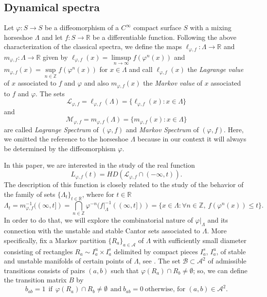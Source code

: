\documentclass[12pt]{amsart}
\newcommand{\infinity}{\infty}
\theoremstyle{plain} %
\theoremstyle{definition} %
\numberwithin{equation}{section}
\begin{document}
\subsection{Dynamical spectra}

Let $\varphi:S\rightarrow S$ be a diffeomorphism of a $C^{\infty}$ compact surface $S$ with a mixing horseshoe $\Lambda$ and let $f:S\rightarrow \mathbb{R}$ be a differentiable function. Following the above characterization of the classical spectra, we define the maps $\ell_{\varphi,f}: \Lambda \rightarrow \mathbb{R}$ and $m_{\varphi,f}: \Lambda \rightarrow \mathbb{R}$ given by $\ell_{\varphi,f}(x)=\limsup\limits_{n\to \infty}f(\varphi^n(x))$ and $m_{\varphi,f}(x)=\sup\limits_{n\in\mathbb{Z}}f(\varphi^n(x))$ for $x\in \Lambda$ and call $\ell_{\varphi,f}(x)$ the \textit{Lagrange value} of $x$ associated to $f$ and $\varphi$ and also $m_{\varphi,f}(x)$ the \textit{Markov value} of $x$ associated to $f$ and $\varphi$. The sets
$$\mathcal{L}_{\varphi,f}=\ell_{\varphi,f}(\Lambda)=\{\ell_{\varphi,f}(x):x\in \Lambda\}$$
and
$$\mathcal{M}_{\varphi,f}=m_{\varphi,f}(\Lambda)=\{m_{\varphi,f}(x):x\in \Lambda\}$$
are called \textit{Lagrange Spectrum} of $(\varphi,f)$ and \textit{Markov Spectrum} of $(\varphi,f)$. Here, we omitted the reference to the horseshoe $\Lambda$ because in our context it will always be determined by the diffeomorphism $\varphi.$

In this paper, we are interested in the study of the real function 
\begin{equation}\label{f1}
L_{\varphi,f}(t)=HD(\mathcal{L}_{\varphi,f}\cap (-\infty,t)) .
\end{equation}
The description of this function is closely related to the study of the behavior of the family of sets $\{\Lambda_t\}_{t\in \mathbb{R}}$, where for $t\in \mathbb{R}$
$$\Lambda_t=m_{\varphi, f}^{-1}((\infinity,t]) =\bigcap\limits_{n\in\mathbb{Z}}\varphi^{-n}(f|_{\Lambda}^{-1}((\infinity,t])) = \{x\in\Lambda: \forall n\in \mathbb{Z}, \ f(\varphi^n(x))\leq t\}.$$
In order to do that, we will explore the combinatorial nature of $\varphi|_{\Lambda}$ and its connection with the unstable and stable Cantor sets associated to $\Lambda$. More specifically, fix a Markov partition $\{R_a\}_{a\in \mathcal{A}}$ of $\Lambda$ with sufficiently small diameter consisting of rectangles $R_a \sim I_a^u \times I_a^s$ delimited by compact pieces $I_a^s$, $I_a^u$, of stable and unstable manifolds of certain points of $\Lambda$, see \cite[Theorem 2, page 172]{PT93}. The set $\mathcal{B}\subset \mathcal{A}^{2}$ of admissible transitions consists of pairs $(a,b)$ such that $\varphi(R_a)\cap R_{b}\neq \emptyset$; so, we can define the transition matrix $B$ by
$$b_{ab}=1 \ \ \text{if} \ \  \varphi(R_a)\cap R_b\neq \emptyset \ \ \text{and}  \ b_{ab}=0  \ \text{otherwise, for $(a,b)\in \mathcal{A}^{2}$.}$$
\end{document}
